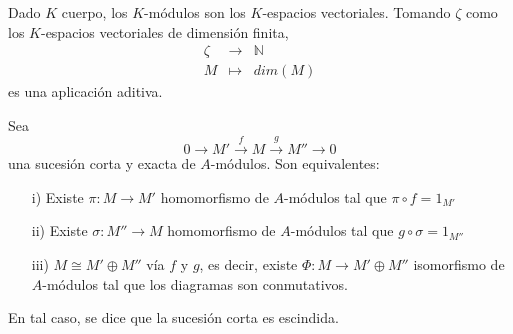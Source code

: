\documentclass[../main.tex]{subfiles}
\begin{document}
\begin{example} Dado $K$ cuerpo, los $K$-módulos son los $K$-espacios vectoriales. Tomando $\zeta$ como los $K$-espacios vectoriales de dimensión finita,
	$$\begin{array}{rcl}
	\zeta&\longrightarrow&\mathbb{N}\\
	M&\longmapsto&dim(M)
	\end{array}$$
	es una aplicación aditiva.
\end{example}
\begin{proposition}\label{esc} Sea$$0\longrightarrow M'\overset{f}{\longrightarrow} M\overset{g}{\longrightarrow} M''\longrightarrow 0$$ una sucesión corta y exacta de $A$-módulos. Son equivalentes:
	\begin{itemize}
		\item [i)] Existe $\pi:M\longrightarrow M'$ homomorfismo de $A$-módulos tal que $\pi\circ f=1_{M'}$
		\item[ii)] Existe $\sigma:M''\longrightarrow M$ homomorfismo de $A$-módulos tal que $g\circ\sigma=1_{M''}$
		\item[iii)] $M\cong M'\oplus M''$ vía $f$ y $g$, es decir, existe $\Phi:M\longrightarrow M'\oplus M''$ isomorfismo de $A$-módulos tal que los diagramas son conmutativos.
	\end{itemize}
	En tal caso, se dice que la sucesión corta es escindida.
\end{proposition}
\end{document}
